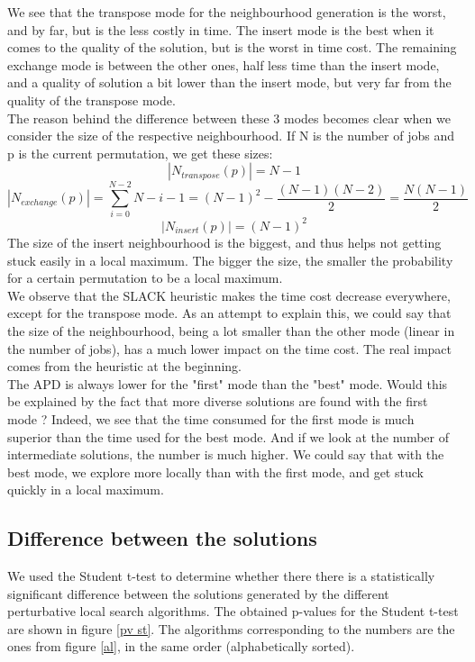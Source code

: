 We see that the transpose mode for the neighbourhood generation is the worst, and by far, but is the less costly in time. The insert mode is the best when it comes to the quality of the solution, but is the worst in time cost. The remaining exchange mode is between the other ones, half less time than the insert mode, and a quality of solution a bit lower than the insert mode, but very far from the quality of the transpose mode.\\

The reason behind the difference between these 3 modes becomes clear when we consider the size of the respective neighbourhood. If N is the number of jobs and p is the current permutation, we get these sizes:
$$|N_{transpose}(p)| = N-1$$
$$|N_{exchange}(p)| = \sum_{i=0}^{N-2}{N-i-1} = (N-1)^2 - \frac{(N-1)(N-2)}{2} = \frac{N(N-1)}{2}$$
$$|N_{insert}(p)| = (N-1)^2$$
The size of the insert neighbourhood is the biggest, and thus helps not getting stuck easily in a local maximum. The bigger the size, the smaller the probability for a certain permutation to be a local maximum.\\

We observe that the SLACK heuristic makes the time cost decrease everywhere, except for the transpose mode. As an attempt to explain this, we could say that the size of the neighbourhood, being a lot smaller than the other mode (linear in the number of jobs), has a much lower impact on the time cost. The real impact comes from the heuristic at the beginning.\\

The APD is always lower for the "first" mode than the "best" mode. Would this be explained by the fact that more diverse solutions are found with the first mode ? Indeed, we see that the time consumed for the first mode is much superior than the time used for the best mode. And if we look at the number of intermediate solutions, the number is much higher. We could say that with the best mode, we explore more locally than with the first mode, and get stuck quickly in a local maximum.

\subsection{Difference between the solutions}
We used the Student t-test to determine whether there there is a statistically significant difference between the solutions generated by the different perturbative local search algorithms. The obtained p-values for the Student t-test are shown in figure \ref{pv st}. The algorithms corresponding to the numbers are the ones from figure \ref{al}, in the same order (alphabetically sorted).\\

